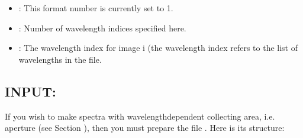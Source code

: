 \documentclass[letterpaper,10pt,english]{sphinxmanual}
\begin{document}
\begin{sphinxVerbatim}[commandchars=\\\{\}]
                           
\PYG{p}{[}\PYG{p}{]}
\PYG{p}{[}\PYG{p}{]}
\end{sphinxVerbatim}
\begin{itemize}
\item {} 
: This format number is currently set to 1.

\item {} 
: Number of wavelength indices specified here.

\item {} 
: The wavelength index for image i (the wavelength
index refers to the list of wavelengths in the  file.

\end{itemize}


\subsection{INPUT: }
\label{\detokenize{inputoutputfiles:input-aperture-info-inp}}\label{\detokenize{inputoutputfiles:sec-aperture-info-file}}
If you wish to make spectra with wavelength\sphinxhyphen{}dependent collecting area, i.e.
aperture (see Section {\hyperref[\detokenize{imagesspectra:sec-aperture}]{}}), then you must prepare the file
. Here is its structure:

\begin{sphinxVerbatim}[commandchars=\\\{\}]
                           
\PYG{p}{[}\PYG{p}{]}      \PYG{p}{[}\PYG{p}{]}
              
              
\PYG{p}{[}\PYG{p}{]}   \PYG{p}{[}\PYG{p}{]}
\end{sphinxVerbatim}
\end{document}
